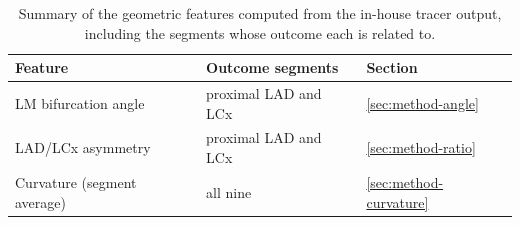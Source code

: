 \begin{table}[htbp]
  \centering
  \caption{Summary of the geometric features computed from the in-house tracer output, including the segments whose outcome each is related to.}
  \label{tab:method-features}
  \begin{tabular}{lll}
    \toprule
    Feature & Outcome segments & Section \\
    \midrule
    LM bifurcation angle & proximal LAD and LCx & \ref{sec:method-angle} \\
    LAD/LCx asymmetry & proximal LAD and LCx & \ref{sec:method-ratio} \\
    Curvature (segment average) & all nine & \ref{sec:method-curvature} \\
    \bottomrule
  \end{tabular}
\end{table}






